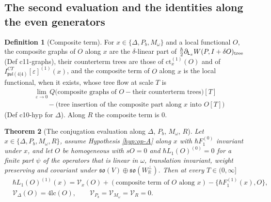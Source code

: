 \documentclass[11pt]{article}
\numberwithin{equation}{section}
\theoremstyle{plain}
\newtheorem{theorem}{Theorem}[section]
\theoremstyle{definition}
\newtheorem{definition}[theorem]{Definition}
\newcommand{\psl}{\mathfrak{psl}(4|4)}
\newcommand{\lc}{\mathrm{lc}}
\newcommand{\ct}{\mathrm{ct}}
\newcommand{\Var}{\mathcal V}
\begin{document}
\subsection{The second evaluation and the identities along the even generators}

\begin{definition}[Composite term]
\label{def:op-compterm}
For $x\in\{\Delta,P_b,M_\omega\}$ and a local functional $O$, the composite graphs of $O$ along $x$ are the $\delta$-linear part of $\tfrac\hbar2\partial_{\mathsf L_x}W(P,I+\delta O)_{\rm tree}$ (Def c11-graphs), their counterterm trees are those of $\ct^{(1)}_x(O)$ and of $I^{CT}_{\psl}[\varepsilon]^{(1)}(x)$, and the composite term of $O$ along $x$ is the local functional, when it exists, whose tree flow at scale $T$ is
\[
\begin{aligned}
&\lim_{\varepsilon\to0}Q\big(\text{composite graphs of }O-\text{their counterterm trees}\big)[T]\\
&\qquad-\big(\text{tree insertion of the composite part along }x\text{ into }O[T]\big)
\end{aligned}
\]
(Def c10-hyp for $\Delta$). Along $R$ the composite term is $0$.
\end{definition}

\begin{theorem}[The conjugation evaluation along $\Delta$, $P_b$, $M_\omega$, $R$]
\label{thm:op-conj}
Let $x\in\{\Delta,P_b,M_\omega,R\}$, assume Hypothesis \ref{hyp:op-A} along $x$ with $\hbar F_1^{(0)}$ invariant under $x$, and let $O$ be homogeneous with $sO=0$ and $\hbar L_1(O)^{(0)}=0$ for a finite part $\psi$ of the operators that is linear in $\omega$, translation invariant, weight preserving and covariant under $\mathfrak{so}(V)\oplus\mathfrak{so}(W_{\mathbb R}^\perp)$. Then at every $T\in(0,\infty]$
\begin{equation}
\begin{aligned}
&\hbar L_1(O)^{(1)}(x)=\Var_x(O)+(\text{composite term of }O\text{ along }x)-\big\{\hbar F_1^{(1)}(x),O\big\},\\
&\Var_\Delta(O)=4\lc(O),\qquad\Var_{P_b}=\Var_{M_\omega}=\Var_R=0 .
\end{aligned}
\label{eq:op-conj}
\end{equation}
\end{theorem}
\end{document}
